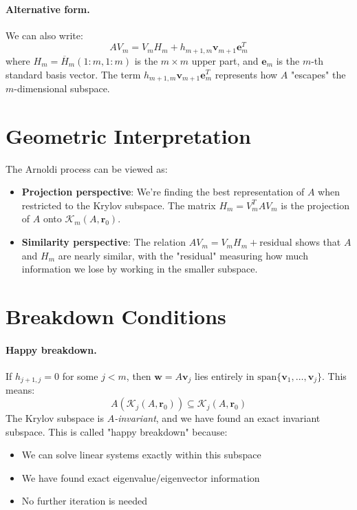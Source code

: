 \paragraph{Alternative form.}
We can also write:
\[
AV_m = V_m H_m + h_{m+1,m}\mathbf{v}_{m+1}\mathbf{e}_m^T
\]
where $H_m = \overline{H}_m(1:m, 1:m)$ is the $m \times m$ upper part, and $\mathbf{e}_m$ is the $m$-th standard basis vector. The term $h_{m+1,m}\mathbf{v}_{m+1}\mathbf{e}_m^T$ represents how $A$ "escapes" the $m$-dimensional subspace.

\section{Geometric Interpretation}

The Arnoldi process can be viewed as:
\begin{itemize}
\item \textbf{Projection perspective}: We're finding the best representation of $A$ when restricted to the Krylov subspace. The matrix $H_m = V_m^T AV_m$ is the projection of $A$ onto $\mathcal{K}_m(A,\mathbf{r}_0)$.
\item \textbf{Similarity perspective}: The relation $AV_m = V_m H_m + \text{residual}$ shows that $A$ and $H_m$ are nearly similar, with the "residual" measuring how much information we lose by working in the smaller subspace.
\end{itemize}

\section{Breakdown Conditions}

\paragraph{Happy breakdown.} If $h_{j+1,j} = 0$ for some $j < m$, then $\mathbf{w} = A\mathbf{v}_j$ lies entirely in $\text{span}\{\mathbf{v}_1, \ldots, \mathbf{v}_j\}$. This means:
\[
A(\mathcal{K}_j(A,\mathbf{r}_0)) \subseteq \mathcal{K}_j(A,\mathbf{r}_0)
\]
The Krylov subspace is \emph{$A$-invariant}, and we have found an exact invariant subspace. This is called "happy breakdown" because:
\begin{itemize}
\item We can solve linear systems exactly within this subspace
\item We have found exact eigenvalue/eigenvector information
\item No further iteration is needed
\end{itemize}

